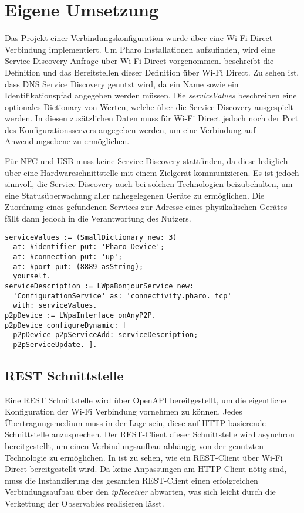 \section{Eigene Umsetzung}
\label{section:implementation}
        Das Projekt einer Verbindungskonfiguration \cite{aiProject} wurde über eine Wi-Fi Direct Verbindung implementiert. Um Pharo Installationen aufzufinden, wird eine Service Discovery Anfrage über Wi-Fi Direct vorgenommen.  beschreibt die Definition und das Bereitstellen dieser Definition über Wi-Fi Direct. Zu sehen ist, dass DNS Service Discovery genutzt wird, da ein Name sowie ein Identifikationspfad angegeben werden müssen. Die {\it serviceValues} beschreiben eine optionales Dictionary von Werten, welche über die Service Discovery ausgespielt werden. In diesen zusätzlichen Daten muss für Wi-Fi Direct jedoch noch der Port des Konfigurationsservers angegeben werden, um eine Verbindung auf Anwendungsebene zu ermöglichen.
        
        Für NFC und USB muss keine Service Discovery stattfinden, da diese lediglich über eine Hardwareschnittstelle mit einem Zielgerät kommunizieren. Es ist jedoch sinnvoll, die Service Discovery auch bei solchen Technologien beizubehalten, um eine Statusüberwachung aller nahegelegenen Geräte zu ermöglichen. Die Zuordnung eines gefundenen Services zur Adresse eines physikalischen Gerätes fällt dann jedoch in die Verantwortung des Nutzers.
        
        \begin{lstlisting}[frame=bt, label={lst:wifi:discovery}, language=Pharo, caption=Service Discovery Definition (Servercode in pharo)]
serviceValues := (SmallDictionary new: 3)
  at: #identifier put: 'Pharo Device';
  at: #connection put: 'up';
  at: #port put: (8889 asString);
  yourself.
serviceDescription := LWpaBonjourService new:
  'ConfigurationService' as: 'connectivity.pharo._tcp'
  with: serviceValues.
p2pDevice := LWpaInterface onAnyP2P.
p2pDevice configureDynamic: [ 
  p2pDevice p2pServiceAdd: serviceDescription;
  p2pServiceUpdate. ].
        \end{lstlisting}        
        
     \subsection{REST Schnittstelle}
        Eine REST Schnittstelle wird über OpenAPI bereitgestellt, um die eigentliche Konfiguration der Wi-Fi Verbindung vornehmen zu können. Jedes Übertragungsmedium muss in der Lage sein, diese auf HTTP basierende Schnittstelle anzusprechen. Der REST-Client dieser Schnittstelle wird asynchron bereitgestellt, um einen \linebreak Verbindungsaufbau abhängig von der genutzten Technologie zu ermöglichen. In  ist zu sehen, wie ein REST-Client über Wi-Fi Direct bereitgestellt wird. Da keine Anpassungen am HTTP-Client nötig sind, muss die Instanziierung des gesamten REST-Client einen erfolgreichen Verbindungsaufbau über den {\it ipReceiver} abwarten, was sich leicht durch die Verkettung der Observables realisieren lässt.
        
